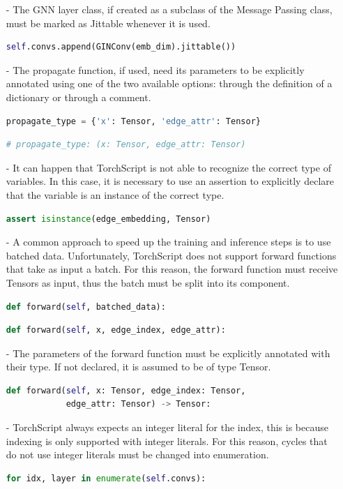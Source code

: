 \begin{itemize}
    \item[-] The GNN layer class, if created as a subclass of the Message Passing class, must be marked as Jittable whenever it is used.
\begin{lstlisting}[language=Python,label={lst:jittable}]
self.convs.append(GINConv(emb_dim).jittable())
\end{lstlisting}
    \item[-] The propagate function, if used, need its parameters to be explicitly annotated using one of the two available options: through the definition of a dictionary or through a comment.
\begin{lstlisting}[language=Python,label={lst:propagate-annotation}]
propagate_type = {'x': Tensor, 'edge_attr': Tensor}
\end{lstlisting}
\begin{lstlisting}[language=Python,label={lst:propagate-annotation-comment}]
# propagate_type: (x: Tensor, edge_attr: Tensor)
\end{lstlisting}
    \item[-] It can happen that TorchScript is not able to recognize the correct type of variables.
    In this case, it is necessary to use an assertion to explicitly declare that the variable is an instance of the correct type.
\begin{lstlisting}[language=Python,label={lst:isinstance-assertion}]
assert isinstance(edge_embedding, Tensor)
\end{lstlisting}
    \item[-] A common approach to speed up the training and inference steps is to use batched data.
    Unfortunately, TorchScript does not support forward functions that take as input a batch.
    For this reason, the forward function must receive Tensors as input, thus the batch must be split into its component.
\begin{lstlisting}[language=Python,label={lst:splitted-forward-before}]
def forward(self, batched_data):
\end{lstlisting}
\begin{lstlisting}[language=Python,label={lst:splitted-forward}]
def forward(self, x, edge_index, edge_attr):
\end{lstlisting}
    \item[-] The parameters of the forward function must be explicitly annotated with their type.
    If not declared, it is assumed to be of type Tensor.
\begin{lstlisting}[language=Python,label={lst:forward-annotation}]
def forward(self, x: Tensor, edge_index: Tensor,
            edge_attr: Tensor) -> Tensor:
\end{lstlisting}
    \item[-] TorchScript always expects an integer literal for the index, this is because indexing is only supported with integer literals.
    For this reason, cycles that do not use integer literals must be changed into enumeration.
\begin{lstlisting}[language=Python,label={lst:enumeration}]
for idx, layer in enumerate(self.convs):
\end{lstlisting}
\end{itemize}

